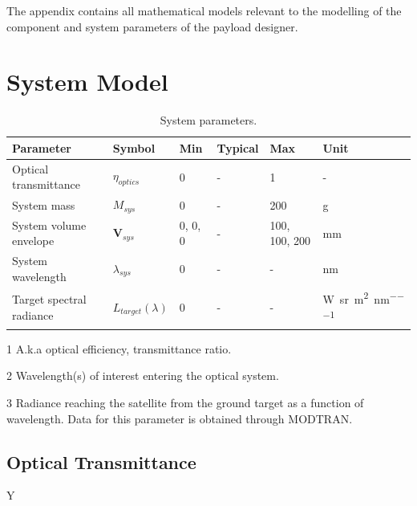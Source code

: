 \appendix
\appendixpage

The appendix contains all mathematical models relevant to the modelling of the component and system parameters of the payload designer.

\section{System Model}

\begin{table}[H]
\centering
\caption{System parameters.}
\label{tab:system-params}
\begin{threeparttable}
\begin{tabular}{@{}llllll@{}}
\toprule
Parameter             & Symbol            & Min & Typical & Max & Unit               \\ \midrule
Optical transmittance\tnote{1} & {$\eta_{optics}$} & 0   & -       & 1   & -                  \\
System mass           & {$M_{sys}$}       & 0   & -       & 200 & {\si{\gram}}       \\
System volume envelope   & {$\mathbf{V}_{sys}$}             & 0, 0, 0 & - & 100, 100, 200 & {\si{\milli\meter}}                                         \\
System wavelength\tnote{2}     & {$\lambda_{sys}$} & 0   & -       & -   & {\si{\nano\meter}} \\
Target spectral radiance\tnote{3} & {$L_{target}(\lambda)$} & 0       & - & -             & {\si{\watt\per\steradian\per\meter\squared\per\nano\meter}} \\ \bottomrule
\end{tabular}
\begin{tablenotes}
\item[1] A.k.a optical efficiency, transmittance ratio.
\item[2] Wavelength(s) of interest entering the optical system.
\item[3] Radiance reaching the satellite from the ground target as a function of wavelength. Data for this parameter is obtained through MODTRAN.
\end{tablenotes}
\end{threeparttable}
\end{table}


\subsection{Optical Transmittance} Y

